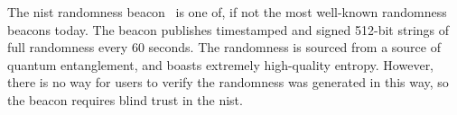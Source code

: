 The \gls{nist} randomness beacon~\cite{nistbeacon} is one of, if not the most well-known randomness beacons today.
The beacon publishes timestamped and signed 512-bit strings of full randomness every 60 seconds.
The randomness is sourced from a source of quantum entanglement, and boasts extremely high-quality entropy.
However, there is no way for users to verify the randomness was generated in this way, so the beacon requires blind trust in the \acrfull{nist}.
